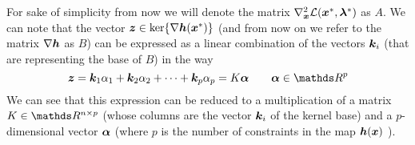 		For sake of simplicity from now we will denote the matrix $\nabla_{\boldsymbol{x}}^2\mathcal L(\boldsymbol{x}^*,\boldsymbol{\lambda}^*)$ as $A$. We can note that the vector $\boldsymbol{z} \in \ker\{\nabla \boldsymbol{h}(\boldsymbol{x}^*)\}$ (and from now on we refer to the matrix $\nabla \boldsymbol{h}$ as $B$) can be expressed as a linear combination of the vectors $\boldsymbol{k}_i$ (that are representing the base of $B$) in the way
		\[ \vett z = \vett k_1 \alpha_1 + \vett k_2 \alpha_2 + \dots + \vett k_p \alpha_p = K \vett \alpha \qquad \vett \alpha \in \R^p \]
		We can see that this expression can be reduced to a multiplication of a matrix $K \in \R^{n\times p}$ (whose columns are the vector $\boldsymbol{k}_i$ of the kernel base) and a $p$-dimensional vector $\boldsymbol{\alpha}$ (where $p$ is the number of constraints in the map $\boldsymbol{h}(\boldsymbol{x})$ ).
	
	
	
	
	
	
	
	
	
	
	
	
	
	
	
	
	
	
	
	
	
	
	
	
	
	
	
	
	
	
	
	
	
	
	
	
	
	
	
	
	
	
	
	
	
	
	
	
	
	
	
	
	
	
	
	
	
	
	
	
	
	